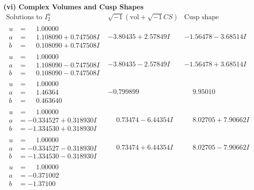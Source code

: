 \documentclass[1p]{elsarticle_modified}
\theoremstyle{definition}
\newcommand{\I}{\sqrt{-1}}
\begin{document}
\newpage\flushleft \textbf{(vi) Complex Volumes and Cusp Shapes}
$$\begin{array}{c|c|c}  
\text{Solutions to }I^u_{2}& \I (\text{vol} + \sqrt{-1}CS) & \text{Cusp shape}\\
 \hline 
\begin{aligned}
u &= \phantom{-}1.00000\phantom{ +0.000000I} \\
a &= \phantom{-}1.108090 + 0.747508 I \\
b &= \phantom{-}0.108090 + 0.747508 I\end{aligned}
 & -3.80435 + 2.57849 I & -1.56478 - 3.68514 I \\ \hline\begin{aligned}
u &= \phantom{-}1.00000\phantom{ +0.000000I} \\
a &= \phantom{-}1.108090 - 0.747508 I \\
b &= \phantom{-}0.108090 - 0.747508 I\end{aligned}
 & -3.80435 - 2.57849 I & -1.56478 + 3.68514 I \\ \hline\begin{aligned}
u &= \phantom{-}1.00000\phantom{ +0.000000I} \\
a &= \phantom{-}1.46364\phantom{ +0.000000I} \\
b &= \phantom{-}0.463640\phantom{ +0.000000I}\end{aligned}
 & -0.799899\phantom{ +0.000000I} & \phantom{-}9.95010\phantom{ +0.000000I} \\ \hline\begin{aligned}
u &= \phantom{-}1.00000\phantom{ +0.000000I} \\
a &= -0.334527 + 0.318930 I \\
b &= -1.334530 + 0.318930 I\end{aligned}
 & \phantom{-}0.73474 - 6.44354 I & \phantom{-}8.02705 + 7.90662 I \\ \hline\begin{aligned}
u &= \phantom{-}1.00000\phantom{ +0.000000I} \\
a &= -0.334527 - 0.318930 I \\
b &= -1.334530 - 0.318930 I\end{aligned}
 & \phantom{-}0.73474 + 6.44354 I & \phantom{-}8.02705 - 7.90662 I \\ \hline\begin{aligned}
u &= \phantom{-}1.00000\phantom{ +0.000000I} \\
a &= -0.371002\phantom{ +0.000000I} \\
b &= -1.37100\phantom{ +0.000000I}\end{aligned}

\end{array}$$
\end{document}
